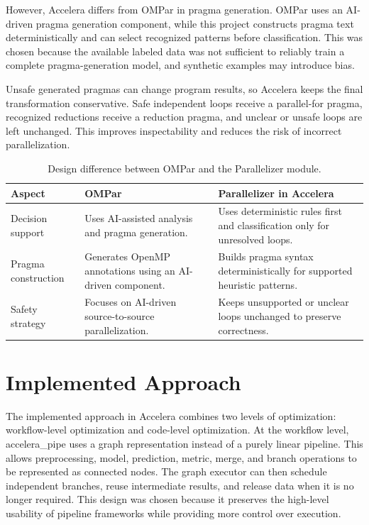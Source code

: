\documentclass[12pt,a4paper,oneside]{report}
\newcommand{\systemname}{Accelera}
\begin{document}
However, \systemname{} differs from OMPar in pragma generation. OMPar uses an
AI-driven pragma generation component, while this project constructs pragma
text deterministically and can select recognized patterns before classification.
This was chosen because the
available labeled data was not sufficient to reliably train a complete
pragma-generation model, and synthetic examples may introduce bias.

Unsafe generated pragmas can change program results, so \systemname{} keeps the
final transformation conservative. Safe independent loops receive a parallel-for
pragma, recognized reductions receive a reduction pragma, and unclear or unsafe
loops are left unchanged. This improves inspectability and reduces the risk of
incorrect parallelization.


\begin{table}[H]
\centering
\normalsize
\renewcommand{\arraystretch}{1.08}
\setlength{\tabcolsep}{5pt}
\caption{Design difference between OMPar and the Parallelizer module.}
\label{tab:ompar-parallelizer-difference}
\begin{tabularx}{\textwidth}{p{}XX}
\toprule
\textbf{Aspect} & \textbf{OMPar} & \textbf{Parallelizer in \systemname{}} \\
\midrule
Decision support &
Uses AI-assisted analysis and pragma generation. &
Uses deterministic rules first and classification only for unresolved loops. \\
\midrule
Pragma construction &
Generates OpenMP annotations using an AI-driven component. &
Builds pragma syntax deterministically for supported heuristic patterns. \\
\midrule
Safety strategy &
Focuses on AI-driven source-to-source parallelization. &
Keeps unsupported or unclear loops unchanged to preserve correctness. \\
\bottomrule
\end{tabularx}
\end{table}


\section{Implemented Approach}

The implemented approach in \systemname{} combines two levels of optimization:
workflow-level optimization and code-level optimization. At the workflow level,
accelera\_pipe uses a graph representation instead of a purely linear
pipeline. This allows preprocessing, model, prediction, metric, merge, and branch
operations to be represented as connected nodes. The graph executor can then
schedule independent branches, reuse intermediate results, and release data when
it is no longer required. This design was chosen because it preserves the
high-level usability of pipeline frameworks while providing more control over
execution.
\end{document}
